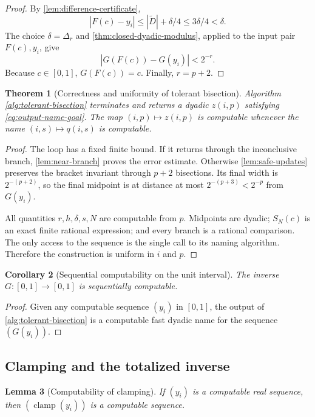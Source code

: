 \documentclass[11pt,oneside]{article}
\newtheorem{theorem}{Theorem}[section]
\newtheorem{lemma}[theorem]{Lemma}
\newtheorem{corollary}[theorem]{Corollary}
\theoremstyle{definition}
\theoremstyle{remark}
\numberwithin{equation}{section}
\newcommand{\Clamp}{\operatorname{clamp}}
\begin{document}
\begin{proof}
By \cref{lem:difference-certificate},
\[
 |F(c)-y_i|\le|\widetilde D|+\delta/4
 \le3\delta/4<\delta.
\]
The choice $\delta=\Delta_r$ and \cref{thm:closed-dyadic-modulus}, applied to
the input pair $F(c),y_i$, give
\[
 |G(F(c))-G(y_i)|<2^{-r}.
\]
Because $c\in[0,1]$, $G(F(c))=c$.  Finally, $r=p+2$.
\end{proof}

\begin{theorem}[Correctness and uniformity of tolerant bisection]
\label{thm:bisection-correct}
Algorithm \ref{alg:tolerant-bisection} terminates and returns a dyadic
$z(i,p)$ satisfying \eqref{eq:output-name-goal}.  The map $(i,p)\mapsto z(i,p)$
is computable whenever the name $(i,s)\mapsto q(i,s)$ is computable.
\end{theorem}

\begin{proof}
The loop has a fixed finite bound.  If it returns through the inconclusive
branch, \cref{lem:near-branch} proves the error estimate.  Otherwise
\cref{lem:safe-updates} preserves the bracket invariant through $p+2$
bisections.  Its final width is $2^{-(p+2)}$, so the final midpoint is at
distance at most $2^{-(p+3)}<2^{-p}$ from $G(y_i)$.

All quantities $r,h,\delta,s,N$ are computable from $p$.  Midpoints are
dyadic; $S_N(c)$ is an exact finite rational expression; and every branch is
a rational comparison.  The only access to the sequence is the single call to
its naming algorithm.  Therefore the construction is uniform in $i$ and $p$.
\end{proof}

\begin{corollary}[Sequential computability on the unit interval]
\label{cor:G-sequential}
The inverse $G:[0,1]\to[0,1]$ is sequentially computable.
\end{corollary}

\begin{proof}
Given any computable sequence $(y_i)$ in $[0,1]$, the output of
\cref{alg:tolerant-bisection} is a computable fast dyadic name for the sequence
$(G(y_i))$.
\end{proof}

\subsection{Clamping and the totalized inverse}

\begin{lemma}[Computability of clamping]\label{lem:clamp-computable}
If $(y_i)$ is a computable real sequence, then
$(\Clamp(y_i))$ is a computable sequence.
\end{lemma}
\end{document}
